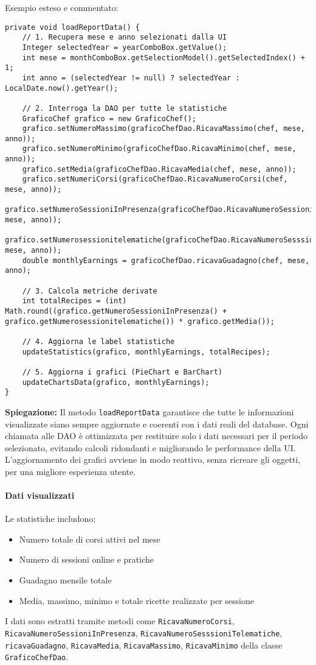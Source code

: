 Esempio esteso e commentato:
\begin{verbatim}
private void loadReportData() {
    // 1. Recupera mese e anno selezionati dalla UI
    Integer selectedYear = yearComboBox.getValue();
    int mese = monthComboBox.getSelectionModel().getSelectedIndex() + 1;
    int anno = (selectedYear != null) ? selectedYear : LocalDate.now().getYear();

    // 2. Interroga la DAO per tutte le statistiche
    GraficoChef grafico = new GraficoChef();
    grafico.setNumeroMassimo(graficoChefDao.RicavaMassimo(chef, mese, anno));
    grafico.setNumeroMinimo(graficoChefDao.RicavaMinimo(chef, mese, anno));
    grafico.setMedia(graficoChefDao.RicavaMedia(chef, mese, anno));
    grafico.setNumeriCorsi(graficoChefDao.RicavaNumeroCorsi(chef, mese, anno));
    grafico.setNumeroSessioniInPresenza(graficoChefDao.RicavaNumeroSessioniInPresenza(chef, mese, anno));
    grafico.setNumerosessionitelematiche(graficoChefDao.RicavaNumeroSesssioniTelematiche(chef, mese, anno));
    double monthlyEarnings = graficoChefDao.ricavaGuadagno(chef, mese, anno);

    // 3. Calcola metriche derivate
    int totalRecipes = (int) Math.round((grafico.getNumeroSessioniInPresenza() + grafico.getNumerosessionitelematiche()) * grafico.getMedia());

    // 4. Aggiorna le label statistiche
    updateStatistics(grafico, monthlyEarnings, totalRecipes);

    // 5. Aggiorna i grafici (PieChart e BarChart)
    updateChartsData(grafico, monthlyEarnings);
}
\end{verbatim}
\textbf{Spiegazione:} Il metodo \texttt{loadReportData} garantisce che tutte le informazioni visualizzate siano sempre aggiornate e coerenti con i dati reali del database. Ogni chiamata alle DAO è ottimizzata per restituire solo i dati necessari per il periodo selezionato, evitando calcoli ridondanti e migliorando le performance della UI. L'aggiornamento dei grafici avviene in modo reattivo, senza ricreare gli oggetti, per una migliore esperienza utente.

\paragraph{Dati visualizzati}
Le statistiche includono:
\begin{itemize}
    \item Numero totale di corsi attivi nel mese
    \item Numero di sessioni online e pratiche
    \item Guadagno mensile totale
    \item Media, massimo, minimo e totale ricette realizzate per sessione
\end{itemize}
I dati sono estratti tramite metodi come \texttt{RicavaNumeroCorsi}, \texttt{RicavaNumeroSessioniInPresenza}, \texttt{RicavaNumeroSesssioniTelematiche}, \texttt{ricavaGuadagno}, \texttt{RicavaMedia}, \texttt{RicavaMassimo}, \texttt{RicavaMinimo} della classe \texttt{GraficoChefDao}.

